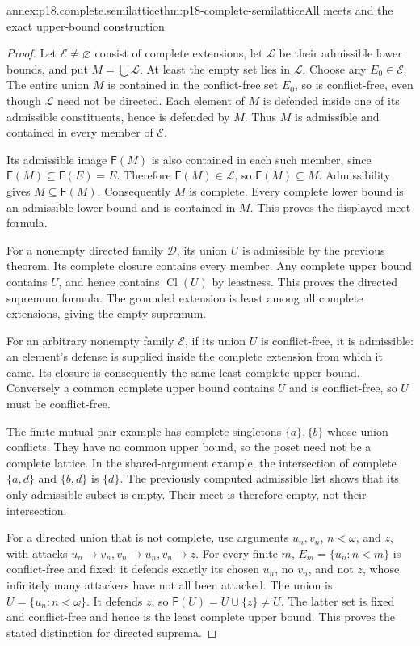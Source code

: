 \begin{annexitem}{annex:p18.complete.semilattice}{thm:p18-complete-semilattice}{All meets and the exact upper-bound construction}
\begin{proof}
Let \(\mathcal E\ne\varnothing\) consist
of complete extensions, let \(\mathcal L\)
be their admissible lower bounds, and
put \(M=\bigcup\mathcal L\).
At least the empty set lies in
\(\mathcal L\). Choose any \(E_0\in\mathcal E\).
The entire union \(M\) is contained
in the conflict-free set \(E_0\),
so is conflict-free, even though
\(\mathcal L\) need not be directed.
Each element of \(M\) is defended
inside one of its admissible
constituents, hence is defended
by \(M\). Thus \(M\) is admissible
and contained in every member
of \(\mathcal E\).

Its admissible image \(\mathsf F(M)\)
is also contained in each such
member, since
\(\mathsf F(M)\subseteq\mathsf F(E)=E\).
Therefore \(\mathsf F(M)\in\mathcal L\),
so \(\mathsf F(M)\subseteq M\).
Admissibility gives \(M\subseteq\mathsf F(M)\).
Consequently \(M\) is complete.
Every complete lower bound is
an admissible lower bound and
is contained in \(M\). This
proves the displayed meet formula.

For a nonempty directed family
\(\mathcal D\), its union \(U\)
is admissible by the previous
theorem. Its complete closure
contains every member. Any
complete upper bound contains
\(U\), and hence contains
\(\operatorname{Cl}(U)\)
by leastness. This proves
the directed supremum formula.
The grounded extension is
least among all complete
extensions, giving the
empty supremum.

For an arbitrary nonempty
family \(\mathcal E\), if
its union \(U\) is conflict-free,
it is admissible: an element's
defense is supplied inside
the complete extension from
which it came. Its closure
is consequently the same
least complete upper bound.
Conversely a common complete
upper bound contains \(U\)
and is conflict-free, so
\(U\) must be conflict-free.

The finite mutual-pair example
has complete singletons
\(\{a\},\{b\}\) whose union
conflicts. They have no
common upper bound, so the
poset need not be a
complete lattice. In the
shared-argument example, the
intersection of complete
\(\{a,d\}\) and \(\{b,d\}\)
is \(\{d\}\). The previously
computed admissible list
shows that its only
admissible subset is empty.
Their meet is therefore
empty, not their intersection.

For a directed union that
is not complete, use arguments
\(u_n,v_n\), \(n<\omega\),
and \(z\), with attacks
\(u_n\to v_n,v_n\to u_n,v_n\to z\).
For every finite \(m\),
\(E_m=\{u_n:n<m\}\) is
conflict-free and fixed:
it defends exactly its
chosen \(u_n\), no \(v_n\),
and not \(z\), whose
infinitely many attackers
have not all been attacked.
The union is \(U=\{u_n:n<\omega\}\).
It defends \(z\), so
\(\mathsf F(U)=U\cup\{z\}\ne U\).
The latter set is fixed
and conflict-free and hence
is the least complete
upper bound. This proves
the stated distinction
for directed suprema.
\end{proof}
\end{annexitem}

